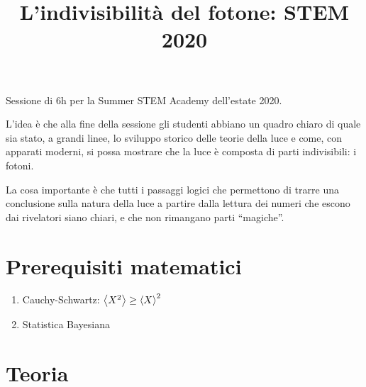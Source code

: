 \documentclass{article}
\title{L'indivisibilità del fotone: STEM 2020}
\begin{document}
\maketitle

Sessione di 6h per la Summer STEM Academy dell'estate 2020. 

L'idea è che alla fine della sessione gli studenti abbiano un quadro chiaro di quale sia stato, a grandi linee, lo sviluppo storico delle teorie della luce e come, con apparati moderni, si possa mostrare che la luce è composta di parti indivisibili: i fotoni. 

La cosa importante è che tutti i passaggi logici che permettono di trarre una conclusione sulla natura della luce a partire dalla lettura dei numeri che escono dai rivelatori siano chiari, e che non rimangano parti ``magiche''. 

\section{Prerequisiti matematici}

\begin{enumerate}
    \item Cauchy-Schwartz: \(\expval{X^2} \geq \expval{X}^2 \)
    \item Statistica Bayesiana
\end{enumerate}

\section{Teoria}
\end{document}
